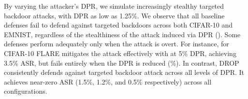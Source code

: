 By varying the attacker's DPR, we simulate  increasingly stealthy targeted backdoor attacks, with DPR as low as 1.25\%. We observe that all baseline defenses fail to defend against targeted backdoors across both CIFAR-10 and EMNIST, regardless of the stealthiness of the attack induced via DPR ().
Some defenses perform adequately only when the attack is overt. For instance, for CIFAR-10 FLARE mitigates the attack effectively with at 5\% DPR, achieving 3.5\% ASR, but fails entirely when the DPR is reduced (\%). In contrast, DROP consistently defends against targeted backdoor attack across all levels of DPR. It achieves near-zero ASR (1.5\%, 1.2\%, and 0.5\% respectively) across all configurations.


